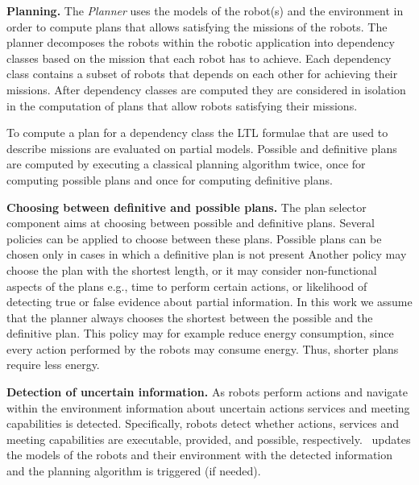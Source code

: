 \textbf{Planning.} 
The \emph{Planner}  uses the models of the robot(s) and the environment in order to compute plans that allows satisfying the missions of the robots.
The planner decomposes the robots within the robotic application into dependency classes based on the mission that each robot has to achieve.
Each dependency class contains a subset of robots that depends on each other for achieving their missions.
After  dependency classes are computed they are considered in isolation in the computation of plans that allow robots satisfying their missions.

To compute a plan for a dependency class the  LTL formulae that are used to describe missions are evaluated on partial models.
Possible and definitive plans are computed by executing a classical planning algorithm twice, once for computing possible plans and once for computing definitive plans.



\textbf{Choosing between definitive and possible plans.}
The plan selector component aims at choosing between possible and definitive plans.
Several policies can be applied to choose between these plans.
Possible plans can be chosen only in cases in which a definitive plan is  not present 
Another policy may choose the plan with the shortest length, or it may consider non-functional aspects of the plans e.g., time to perform certain actions, or likelihood of detecting true or false evidence about partial information. 
In this work we assume  that the planner always chooses the shortest between the possible and the definitive plan.
This policy may for example reduce energy consumption, since every action performed by the robots may consume energy. 
Thus, shorter plans require less energy.

\textbf{Detection of uncertain information.}
As robots perform actions and navigate within the environment information about uncertain actions services and meeting capabilities is detected.
Specifically, robots detect whether actions, services and meeting capabilities are executable, provided, and possible, respectively.
\toolName\ updates the models of the robots and their environment with the detected information and the planning algorithm is triggered (if needed).






